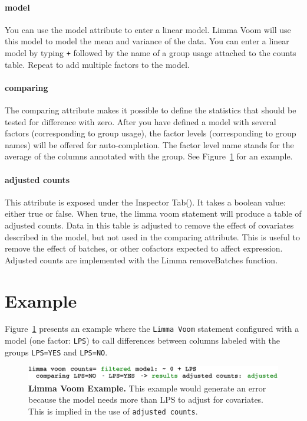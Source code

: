 \paragraph{model}
You can use the model attribute to enter a linear model. Limma Voom will use this model to model the mean and variance of the data. You can enter a linear model by typing \texttt{+} followed by the name of a group usage attached to the counts table. Repeat to add multiple factors to the model. 

\paragraph{comparing}
The comparing attribute makes it possible to define the statistics that should be tested for difference with zero. After you have defined a model with several factors (corresponding to group usage), the factor levels (corresponding to group names) will be offered for auto-completion. The factor level name stands for the average of the columns annotated with the group. See Figure~\ref{fig:LimmaVoomExample} for an example. 

\paragraph{adjusted counts}
This attribute is exposed under the Inspector Tab(\inspectorTabIcon). It takes a boolean value: either true or false. When true, the limma voom statement will produce a table of adjusted counts. Data in this table is adjusted to remove the effect of covariates described in the model, but not used in the comparing attribute. This is useful to remove the effect of batches, or other cofactors expected to affect expression. Adjusted counts are implemented with the Limma removeBatches function.   
 
\section{Example}
Figure~\ref{fig:LimmaVoomExample} presents an example where the \texttt{Limma Voom} statement configured with a model (one factor: \texttt{LPS}) to call differences between columns labeled with the groups \texttt{LPS=YES} and \texttt{LPS=NO}.



\begin{figure}[h!tbp]
  \centering
  \includegraphics[width=\figWidthWide]{figures/LimmaVoomExample.pdf}
\caption[Limma Voom Example.]{\textbf{Limma Voom Example.} This example would generate an error because the model needs more than LPS to adjust for covariates. This is implied in the use of \texttt{adjusted counts}.}
\label{fig:LimmaVoomExample}
\end{figure}

